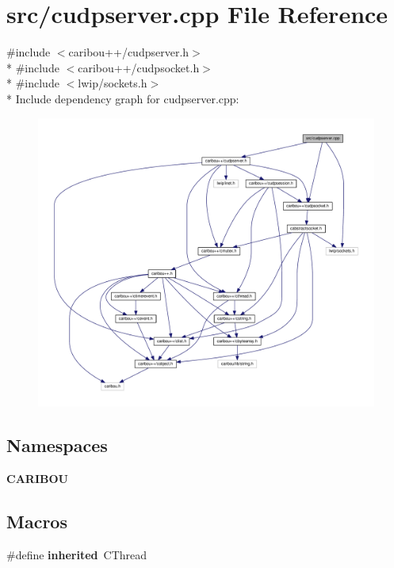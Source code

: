 \section{src/cudpserver.cpp File Reference}
\label{cudpserver_8cpp}
{\ttfamily \#include $<$caribou++/cudpserver.\+h$>$}\\*
{\ttfamily \#include $<$caribou++/cudpsocket.\+h$>$}\\*
{\ttfamily \#include $<$lwip/sockets.\+h$>$}\\*
Include dependency graph for cudpserver.\+cpp\+:
\nopagebreak
\begin{figure}[H]
\begin{center}
\leavevmode
\includegraphics[width=350pt]{cudpserver_8cpp__incl}
\end{center}
\end{figure}
\subsection*{Namespaces}
\begin{DoxyCompactItemize}
\item 
 {\bf C\+A\+R\+I\+B\+OU}
\end{DoxyCompactItemize}
\subsection*{Macros}
\begin{DoxyCompactItemize}
\item 
\#define {\bf inherited}~C\+Thread
\end{DoxyCompactItemize}


